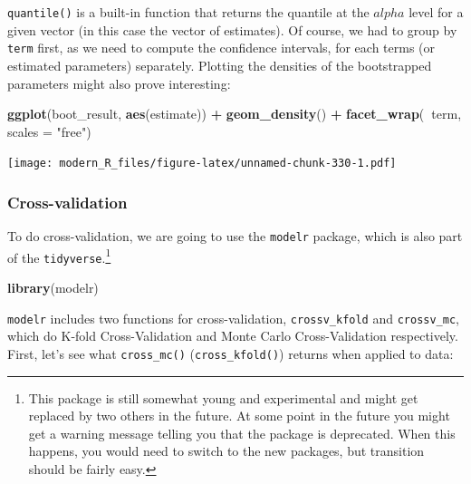 \documentclass[]{gitbook}
\newenvironment{Shaded}{\begin{snugshade}}{\end{snugshade}}
\newcommand{\DataTypeTok}[1]{\textcolor[rgb]{0.13,0.29,0.53}{#1}}
\newcommand{\DecValTok}[1]{\textcolor[rgb]{0.00,0.00,0.81}{#1}}
\newcommand{\KeywordTok}[1]{\textcolor[rgb]{0.13,0.29,0.53}{\textbf{#1}}}
\newcommand{\NormalTok}[1]{#1}
\newcommand{\OperatorTok}[1]{\textcolor[rgb]{0.81,0.36,0.00}{\textbf{#1}}}
\newcommand{\StringTok}[1]{\textcolor[rgb]{0.31,0.60,0.02}{#1}}
\let\rmarkdownfootnote\footnote%
\def\footnote{\protect\rmarkdownfootnote}
\theoremstyle{definition}
\theoremstyle{definition}
\theoremstyle{definition}
\theoremstyle{remark}
\begin{document}
\texttt{quantile()} is a built-in function that returns the quantile at
the \(alpha\) level for a given vector (in this case the vector of
estimates). Of course, we had to group by \texttt{term} first, as we
need to compute the confidence intervals, for each terms (or estimated
parameters) separately. Plotting the densities of the bootstrapped
parameters might also prove interesting:

\begin{Shaded}
\begin{Highlighting}[]
\KeywordTok{ggplot}\NormalTok{(boot_result, }\KeywordTok{aes}\NormalTok{(estimate)) }\OperatorTok{+}
\StringTok{  }\KeywordTok{geom_density}\NormalTok{() }\OperatorTok{+}
\StringTok{  }\KeywordTok{facet_wrap}\NormalTok{(}\OperatorTok{~}\NormalTok{term, }\DataTypeTok{scales =} \StringTok{"free"}\NormalTok{)}
\end{Highlighting}
\end{Shaded}

\texttt{[image: modern\_R\_files/figure-latex/unnamed-chunk-330-1.pdf]}

\hypertarget{cross-validation}{%
\subsubsection{Cross-validation}\label{cross-validation}}

To do cross-validation, we are going to use the \texttt{modelr} package,
which is also part of the \texttt{tidyverse}.\footnote{This package is
  still somewhat young and experimental and might get replaced by two
  others in the future. At some point in the future you might get a
  warning message telling you that the package is deprecated. When this
  happens, you would need to switch to the new packages, but transition
  should be fairly easy.}

\begin{Shaded}
\begin{Highlighting}[]
\KeywordTok{library}\NormalTok{(modelr)}
\end{Highlighting}
\end{Shaded}

\texttt{modelr} includes two functions for cross-validation,
\texttt{crossv\_kfold} and \texttt{crossv\_mc}, which do K-fold
Cross-Validation and Monte Carlo Cross-Validation respectively. First,
let's see what \texttt{cross\_mc()} (\texttt{cross\_kfold()}) returns
when applied to data:

\begin{Shaded}
\end{Shaded}
\end{document}
